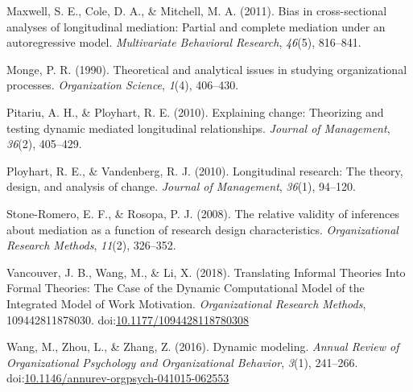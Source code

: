 \documentclass[english,,man]{apa6}
\theoremstyle{definition}
\theoremstyle{definition}
\theoremstyle{definition}
\theoremstyle{remark}
\begin{document}
\leavevmode\hypertarget{ref-maxwell2011bias}{}%
Maxwell, S. E., Cole, D. A., \& Mitchell, M. A. (2011). Bias in
cross-sectional analyses of longitudinal mediation: Partial and complete
mediation under an autoregressive model. \emph{Multivariate Behavioral
Research}, \emph{46}(5), 816--841.

\leavevmode\hypertarget{ref-monge_theoretical_1990}{}%
Monge, P. R. (1990). Theoretical and analytical issues in studying
organizational processes. \emph{Organization Science}, \emph{1}(4),
406--430.

\leavevmode\hypertarget{ref-pitariu_explaining_2010}{}%
Pitariu, A. H., \& Ployhart, R. E. (2010). Explaining change: Theorizing
and testing dynamic mediated longitudinal relationships. \emph{Journal
of Management}, \emph{36}(2), 405--429.

\leavevmode\hypertarget{ref-ployhart_longitudinal_2010}{}%
Ployhart, R. E., \& Vandenberg, R. J. (2010). Longitudinal research: The
theory, design, and analysis of change. \emph{Journal of Management},
\emph{36}(1), 94--120.

\leavevmode\hypertarget{ref-stone2008relative}{}%
Stone-Romero, E. F., \& Rosopa, P. J. (2008). The relative validity of
inferences about mediation as a function of research design
characteristics. \emph{Organizational Research Methods}, \emph{11}(2),
326--352.

\leavevmode\hypertarget{ref-vancouver_translating_2018}{}%
Vancouver, J. B., Wang, M., \& Li, X. (2018). Translating Informal
Theories Into Formal Theories: The Case of the Dynamic Computational
Model of the Integrated Model of Work Motivation. \emph{Organizational
Research Methods}, 109442811878030.
doi:\href{https://doi.org/10.1177/1094428118780308}{10.1177/1094428118780308}

\leavevmode\hypertarget{ref-Wang2016}{}%
Wang, M., Zhou, L., \& Zhang, Z. (2016). Dynamic modeling. \emph{Annual
Review of Organizational Psychology and Organizational Behavior},
\emph{3}(1), 241--266.
doi:\href{https://doi.org/10.1146/annurev-orgpsych-041015-062553}{10.1146/annurev-orgpsych-041015-062553}
\end{document}
